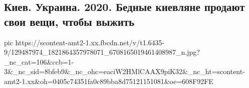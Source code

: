  
 
 
 
 

\subsection{Киев. Украина. 2020. Бедные киевляне продают свои вещи, чтобы выжить}
\label{sec:05_12_2020.fb.kiev}

\ifcmt
  pic https://scontent-amt2-1.xx.fbcdn.net/v/t1.6435-9/129487974_1821864357978071_6708165019461408987_n.jpg?_nc_cat=106&ccb=1-3&_nc_sid=8bfeb9&_nc_ohc=eaciW2HMlCAAX9piK32&_nc_ht=scontent-amt2-1.xx&oh=0405c74351fa0c89bba8d75121151081&oe=608F92FE
\fi

